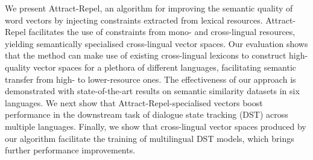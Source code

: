 We present Attract-Repel, an algorithm for improving the semantic quality of word vectors by injecting constraints extracted from lexical resources. Attract-Repel facilitates the use of constraints from mono- and cross-lingual resources, yielding semantically specialised cross-lingual vector spaces. Our evaluation shows that the method can make use of existing cross-lingual lexicons to construct high-quality vector spaces for a plethora of different languages, facilitating semantic transfer from high- to lower-resource ones. The effectiveness of our approach is demonstrated with state-of-the-art results on semantic similarity datasets in six languages. We next show that Attract-Repel-specialised vectors boost performance in the downstream task of dialogue state tracking (DST) across multiple languages. Finally, we show that cross-lingual vector spaces produced by our algorithm facilitate the training of multilingual DST models, which brings further performance improvements.
